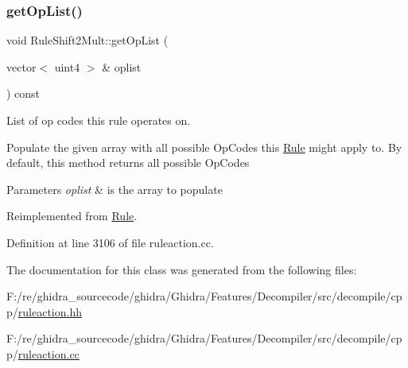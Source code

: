\subsubsection{\texorpdfstring{getOpList()}{getOpList()}}
{\footnotesize\ttfamily void Rule\+Shift2\+Mult\+::get\+Op\+List (\begin{DoxyParamCaption}\item[{vector$<$ uint4 $>$ \&}]{oplist }\end{DoxyParamCaption}) const\hspace{0.3cm}{\ttfamily [virtual]}}



List of op codes this rule operates on. 

Populate the given array with all possible Op\+Codes this \mbox{\hyperlink{class_rule}{Rule}} might apply to. By default, this method returns all possible Op\+Codes 
\begin{DoxyParams}{Parameters}
{\em oplist} & is the array to populate \\
\hline
\end{DoxyParams}


Reimplemented from \mbox{\hyperlink{class_rule_a4023bfc7825de0ab866790551856d10e}{Rule}}.



Definition at line 3106 of file ruleaction.\+cc.



The documentation for this class was generated from the following files\+:\begin{DoxyCompactItemize}
\item 
F\+:/re/ghidra\+\_\+sourcecode/ghidra/\+Ghidra/\+Features/\+Decompiler/src/decompile/cpp/\mbox{\hyperlink{ruleaction_8hh}{ruleaction.\+hh}}\item 
F\+:/re/ghidra\+\_\+sourcecode/ghidra/\+Ghidra/\+Features/\+Decompiler/src/decompile/cpp/\mbox{\hyperlink{ruleaction_8cc}{ruleaction.\+cc}}\end{DoxyCompactItemize}
